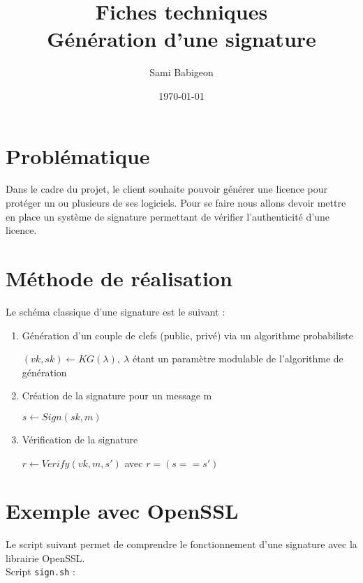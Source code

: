 \documentclass{article}
\title{
    \Huge
    Fiches techniques\\
    Génération d'une signature
}
\author{\huge Sami Babigeon}
\date{\huge \today}
\begin{document}
\maketitle
\newpage

\section{Problématique}

Dans le cadre du projet, le client souhaite pouvoir générer une licence pour protéger un ou plusieurs de ses logiciels. 
Pour se faire nous allons devoir mettre en place un système de signature permettant de vérifier l'authenticité d'une licence.

\section{Méthode de réalisation}

Le schéma classique d'une signature est le suivant :\\

\begin{enumerate}
    \item Génération d'un couple de clefs (public, privé) via un algorithme probabiliste\\

	\centerline{$(vk, sk) \leftarrow KG(\lambda),\ \lambda$ étant un paramètre modulable de l'algorithme de génération}
	\medskip

    \item Création de la signature pour un message m\\

	\centerline{$s \leftarrow Sign(sk, m)$}
	\medskip

    \item Vérification de la signature\\

	\centerline{$r \leftarrow Verify(vk, m, s')$ avec $r = (s == s')$}
	\medskip
\end{enumerate}
\newpage

\section{Exemple avec OpenSSL}

Le script suivant permet de comprendre le fonctionnement d'une signature avec la librairie
OpenSSL.\\

Script \verb:sign.sh: :
\end{document}
